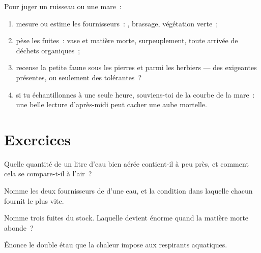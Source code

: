 \begin{method}\label{met:g7:oxygen-in-the-water:judge}
Pour juger un ruisseau ou une mare~:
\begin{enumerate}
  \item mesure ou estime les fournisseurs~: , brassage,
        végétation verte~;
  \item pèse les fuites~: vase et matière morte, surpeuplement,
        toute arrivée de déchets organiques~;
  \item recense la petite faune sous les pierres et parmi les
        herbiers --- des  exigeantes présentes, ou seulement
        des tolérantes~?
  \item si tu échantillonnes à une seule heure, souviens-toi de la
        courbe de la mare~: une belle lecture d'après-midi peut
        cacher une aube mortelle.
\end{enumerate}
\end{method}

\section{Exercices}

\begin{exercise}[$\star$]\label{exo:g7:oxygen-in-the-water:1}
Quelle quantité de  un litre d'eau bien aérée contient-il à
peu près, et comment cela se compare-t-il à l'air~?
\end{exercise}

\begin{exercise}[$\star$]\label{exo:g7:oxygen-in-the-water:2}
Nomme les deux fournisseurs de  d'une eau, et la condition
dans laquelle chacun fournit le plus vite.
\end{exercise}

\begin{exercise}[$\star$]\label{exo:g7:oxygen-in-the-water:3}
Nomme trois fuites du stock. Laquelle devient énorme quand la
matière morte abonde~?
\end{exercise}

\begin{exercise}[$\star$]\label{exo:g7:oxygen-in-the-water:4}
Énonce le double étau que la chaleur impose aux respirants
aquatiques.
\end{exercise}

